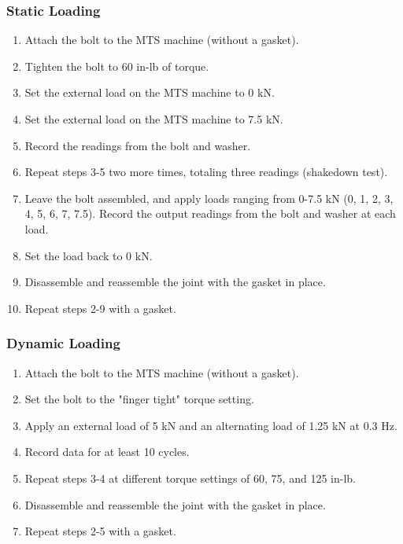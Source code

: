 \subsubsection{Static Loading}
\begin{enumerate}
    \item Attach the bolt to the MTS machine (without a gasket).
    \item Tighten the bolt to 60 in-lb of torque.
    \item Set the external load on the MTS machine to 0 kN.
    \item Set the external load on the MTS machine to 7.5 kN.
    \item Record the readings from the bolt and washer.
    \item Repeat steps 3-5 two more times, totaling three readings (shakedown test).
    \item Leave the bolt assembled, and apply loads ranging from 0-7.5 kN (0, 1, 2, 3, 4, 5, 6, 7, 7.5). Record the output readings from the bolt and washer at each load.
    \item Set the load back to 0 kN.
    \item Disassemble and reassemble the joint with the gasket in place.
    \item Repeat steps 2-9 with a gasket.
\end{enumerate}
\subsubsection{Dynamic Loading}
\begin{enumerate}
    \item Attach the bolt to the MTS machine (without a gasket).
    \item Set the bolt to the "finger tight" torque setting.
    \item Apply an external load of 5 kN and an alternating load of 1.25 kN at 0.3 Hz.
    \item Record data for at least 10 cycles.
    \item Repeat steps 3-4 at different torque settings of 60, 75, and 125 in-lb.
    \item Disassemble and reassemble the joint with the gasket in place.
    \item Repeat steps 2-5 with a gasket.
\end{enumerate}
